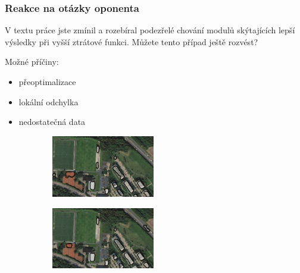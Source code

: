 \documentclass{beamer}
\begin{document}
\begin{frame}

\frametitle{Reakce na otázky oponenta}

V textu práce jste zmínil a rozebíral podezřelé chování modulů skýtajících lepší výsledky při vyšší ztrátové funkci. Můžete tento případ ještě rozvést?

\begin{center}
	\noindent\makebox[\linewidth]{\rule{0.9\textwidth}{0.4pt}}
\end{center}

\bigskip

Možné příčiny:
\begin{itemize}
	\item<2-> přeoptimalizace
	\item<3-> lokální odchylka
	\item<4-> nedostatečná data
\end{itemize}

\begin{figure}
	\centering
	\begin{minipage}{.45\textwidth}
		\centering
		\begin{figure}[ht]
	  		\includegraphics[width=4.5cm]{pictures/out_b_150.png}
		\end{figure}
    \end{minipage}%
    \begin{minipage}{.6\textwidth}
		\centering
		\begin{figure}[ht]
			\includegraphics[width=4.5cm]{pictures/out_b_180.png}
		\end{figure}
	\end{minipage}
\end{figure}

\end{frame}
\fi
\end{document}
